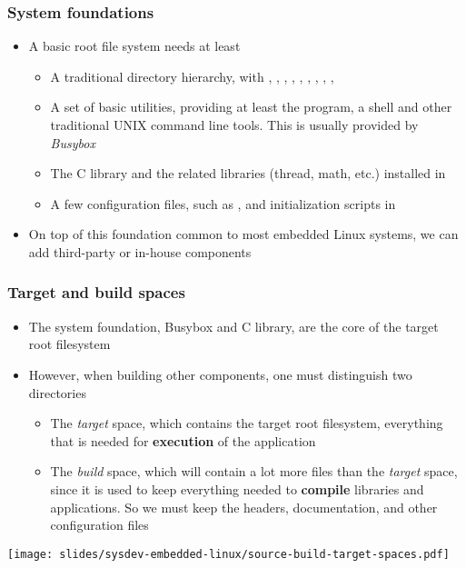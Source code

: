 \begin{frame}
  \frametitle{System foundations}
  \begin{itemize}
  \item A basic root file system needs at least
    \begin{itemize}
    \item A traditional directory hierarchy, with ,
      , , , ,
      , , ,
      , 
    \item A set of basic utilities, providing at least the 
      program, a shell and other traditional UNIX command line
      tools. This is usually provided by {\em Busybox}
    \item The C library and the related libraries (thread, math, etc.)
      installed in 
    \item A few configuration files, such as , and
      initialization scripts in 
    \end{itemize}
  \item On top of this foundation common to most embedded Linux
    systems, we can add third-party or in-house components
  \end{itemize}
\end{frame}

\begin{frame}
  \frametitle{Target and build spaces}
  \begin{itemize}
  \item The system foundation, Busybox and C library, are the core of
    the target root filesystem
  \item However, when building other components, one must distinguish
    two directories
    \begin{itemize}
    \item The {\em target} space, which contains the target root
      filesystem, everything that is needed for {\bf execution} of the
      application
    \item The {\em build} space, which will contain a lot more files
      than the {\em target} space, since it is used to keep everything
      needed to {\bf compile} libraries and applications. So we must
      keep the headers, documentation, and other configuration files
    \end{itemize}
  \end{itemize}
  \texttt{[image: slides/sysdev-embedded-linux/source-build-target-spaces.pdf]}
\end{frame}

